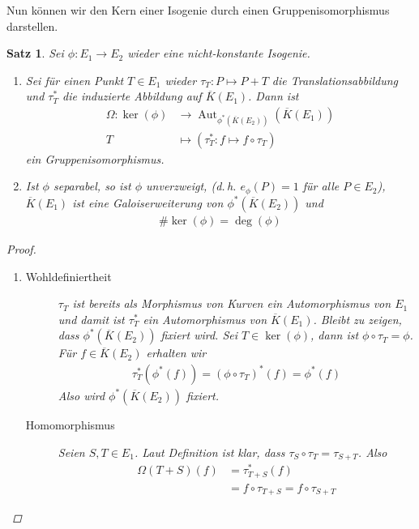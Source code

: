 \documentclass[english, german, parskip=half]{scrartcl}
\newtheorem{Satz}{Satz}[section]
\theoremstyle{definition}
\theoremstyle{remark}
\newcommand*{\algK}{\ensuremath{\overline K}} %
\newcommand*{\longto}{\longrightarrow}
\DeclareMathOperator{\Aut}{Aut} %
\begin{document}
Nun können wir den Kern einer Isogenie durch einen
Gruppenisomorphismus darstellen.
\begin{Satz}\label{galois}
  Sei $\phi\colon E_1\to E_2$ wieder eine nicht-konstante Isogenie.
  \begin{enumerate}[label=\roman*)]
  \item Sei für einen Punkt $T\in E_1$ wieder 
    $\tau_T\colon P\mapsto P+T$ die Translationsabbildung und 
    $\tau_T^*$ die induzierte Abbildung auf $\algK(E_1)$.
    Dann ist
    \begin{align*}
      \Omega\colon
      \ker(\phi) 
      &\longto \Aut_{\phi^*(\algK(E_2))}\left( \algK(E_1) \right) \\
      T 
      &\longmapsto \left( \tau_T^* \colon f\mapsto f\circ \tau_T \right)
    \end{align*}
    ein Gruppenisomorphismus.
  \item Ist $\phi$ separabel, 
    so ist $\phi$ unverzweigt,
    (d.\,h. $e_\phi(P)=1$ für alle $P\in E_2$),
    $\algK(E_1)$ ist eine Galoiserweiterung von $\phi^*(\algK(E_2))$
    und
    \begin{gather*}
      \#\ker(\phi) = \deg(\phi)
    \end{gather*}
\end{enumerate}
\begin{proof}~
  \begin{enumerate}[label=\roman*)]
  \item 
    \begin{description}
        \item[Wohldefiniertheit] $\tau_T$ ist bereits als Morphismus
          von Kurven ein Automorphismus von $E_1$ und damit ist
          $\tau_T^*$ ein Automorphismus von $\algK(E_1)$. Bleibt zu
          zeigen, dass $\phi^*(\algK(E_2))$ fixiert wird.
          Sei $T\in\ker(\phi)$, dann ist $\phi\circ\tau_T=\phi$.
          Für $f\in\algK(E_2)$ erhalten wir
          \begin{gather*}
            \tau_T^*(\phi^*(f)) = (\phi\circ\tau_T)^*(f) = \phi^*(f)
          \end{gather*}
          Also wird $\phi^*(\algK(E_2))$ fixiert.
        \item[Homomorphismus] Seien $S,T\in E_1$. Laut Definition ist
          klar, dass $\tau_S\circ\tau_T = \tau_{S+T}$. Also
          \begin{align*}
            \Omega(T+S)(f)
            &= \tau^*_{T+S}(f)\\
            &= f\circ\tau_{T+S} 
            = f\circ\tau_{S+T}

\end{align*}
\end{description}
\end{enumerate}
\end{proof}
\end{Satz}
\end{document}
